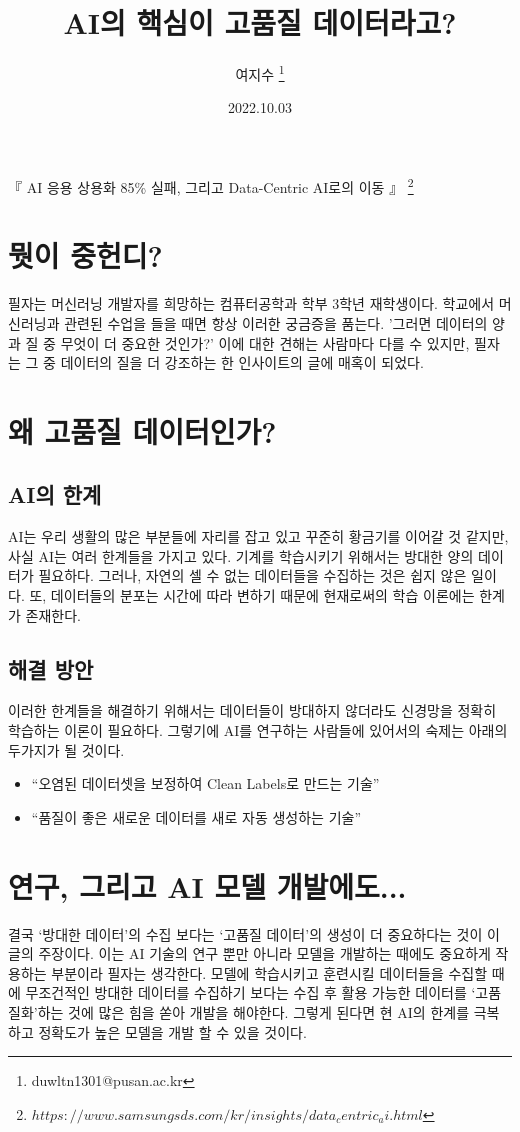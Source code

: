 \documentclass[11pt, a4paper]{article}
\begin{document}
\title{AI의 핵심이 고품질 데이터라고?}
\author{여지수 \footnote{duwltn1301@pusan.ac.kr}}
\date{2022.10.03}
\maketitle

\begin{displayquote} 
\centering %
    『 AI 응용 상용화 85\% 실패, 그리고 Data-Centric AI로의 이동 』 \footnote{$https://www.samsungsds.com/kr/insights/data_centric_ai.html$}
\end{displayquote}

\section{뭣이 중헌디?}
필자는 머신러닝 개발자를 희망하는 컴퓨터공학과 학부 3학년 재학생이다. 
학교에서 머신러닝과 관련된 수업을 들을 때면 항상 이러한 궁금증을 품는다. 
'그러면 데이터의 양과 질 중 무엇이 더 중요한 것인가?' 
이에 대한 견해는 사람마다 다를 수 있지만, 필자는 그 중 데이터의 질을 더 강조하는 한 인사이트의 글에 매혹이 되었다.

\section{왜 고품질 데이터인가?}
\subsection{AI의 한계}
AI는 우리 생활의 많은 부분들에 자리를 잡고 있고 꾸준히 황금기를 이어갈 것 같지만, 사실 AI는 여러 한계들을 가지고 있다. 
기계를 학습시키기 위해서는 방대한 양의 데이터가 필요하다. 
그러나, 자연의 셀 수 없는 데이터들을 수집하는 것은 쉽지 않은 일이다.
또, 데이터들의 분포는 시간에 따라 변하기 때문에 현재로써의 학습 이론에는 한계가 존재한다. 

\subsection{해결 방안}
이러한 한계들을 해결하기 위해서는 데이터들이 방대하지 않더라도 신경망을 정확히 학습하는 이론이 필요하다. 
그렇기에 AI를 연구하는 사람들에 있어서의 숙제는 아래의 두가지가 될 것이다.
\begin{itemize}
    \item  “오염된 데이터셋을 보정하여 Clean Labels로 만드는 기술”
    \item  “품질이 좋은 새로운 데이터를 새로 자동 생성하는 기술”
\end{itemize}

\section{연구, 그리고 AI 모델 개발에도...}
결국 ‘방대한 데이터’의 수집 보다는 ‘고품질 데이터’의 생성이 더 중요하다는 것이 이 글의 주장이다. 
이는 AI 기술의 연구 뿐만 아니라 모델을 개발하는 때에도 중요하게 작용하는 부분이라 필자는 생각한다. 
모델에 학습시키고 훈련시킬 데이터들을 수집할 때에 무조건적인 방대한 데이터를 수집하기 보다는 수집 후 활용 가능한 데이터를 ‘고품질화'하는 것에 많은 힘을 쏟아 개발을 해야한다. 
그렇게 된다면 현 AI의 한계를 극복하고 정확도가 높은 모델을 개발 할 수 있을 것이다.
\end{document}
